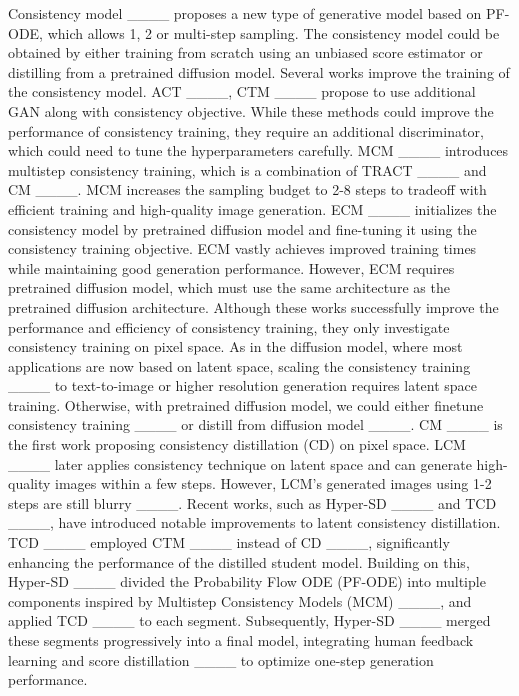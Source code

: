 
Consistency model ____ proposes a new type of generative model based on PF-ODE, which allows 1, 2 or multi-step sampling. The consistency model could be obtained by either training from scratch using an unbiased score estimator or distilling from a pretrained diffusion model. Several works improve the training of the consistency model. ACT ____, CTM ____ propose to use additional GAN along with consistency objective. While these methods could improve the performance of consistency training, they require an additional discriminator, which could need to tune the hyperparameters carefully. MCM ____ introduces multistep consistency training, which is a combination of TRACT ____ and CM ____. MCM increases the sampling budget to 2-8 steps to tradeoff with efficient training and high-quality image generation. ECM ____ initializes the consistency model by pretrained diffusion model and fine-tuning it using the consistency training objective. ECM vastly achieves improved training times while maintaining good generation performance. However, ECM requires pretrained diffusion model, which must use the same architecture as the pretrained diffusion architecture. Although these works successfully improve the performance and efficiency of consistency training, they only investigate consistency training on pixel space. As in the diffusion model, where most applications are now based on latent space, scaling the consistency training ____ to text-to-image or higher resolution generation requires latent space training. Otherwise, with pretrained diffusion model, we could either finetune consistency training ____ or distill from diffusion model ____. CM ____ is the first work proposing consistency distillation (CD) on pixel space. LCM ____ later applies consistency technique on latent space and can generate high-quality images within a few steps. However, LCM's generated images using 1-2 steps are still blurry ____. Recent works, such as Hyper-SD ____ and TCD ____, have introduced notable improvements to latent consistency distillation. TCD ____ employed CTM ____ instead of CD ____, significantly enhancing the performance of the distilled student model. Building on this, Hyper-SD ____ divided the Probability Flow ODE (PF-ODE) into multiple components inspired by Multistep Consistency Models (MCM) ____, and applied TCD ____ to each segment. Subsequently, Hyper-SD ____ merged these segments progressively into a final model, integrating human feedback learning and score distillation ____ to optimize one-step generation performance.